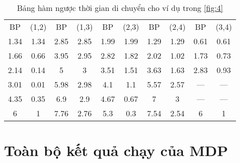 \documentclass[../main.tex]{subfiles}
\begin{document}
\begin{table}[H]
    \centering
    \caption{Bảng hàm ngược thời gian di chuyển cho ví dụ trong \autoref{fig:4}}
    \label{tabel:rev-arc}
    \small
    \setlength\extrarowheight{-1pt}
    \begin{tabular}{|c|c||c|c||c|c||c|c||c|c|}
    \toprule
    BP   & (1,2) & BP   & (1,3) & BP   & (2,3) & BP   & (2,4) & BP   & (3,4) \\ 
    1.34 & 1.34  & 2.85 & 2.85  & 1.99 & 1.99  & 1.29 & 1.29  & 0.61 & 0.61  \\ 
    1.66 & 0.66  & 3.95 & 2.95  & 2.82 & 1.82  & 2.02 & 1.02  & 1.73 & 0.73  \\ 
    2.14 & 0.14  & 5    & 3     & 3.51 & 1.51  & 3.63 & 1.63  & 2.83 & 0.93  \\ 
    3.01 & 0.01  & 5.98 & 2.98  & 4.1  & 1.1   & 5.57 & 2.57  & --- & ---  \\ 
    4.35 & 0.35  & 6.9  & 2.9   & 4.67 & 0.67  & 7    & 3     & --- & ---  \\ 
    6    & 1     & 7.76 & 2.76  & 5.3  & 0.3   & 7.54 & 2.54  & 6    & 1     \\ 
    \bottomrule
    \end{tabular}
\end{table}

\section{Toàn bộ kết quả chạy của MDP}\label{appendix-mdp-mttp}
\end{document}
